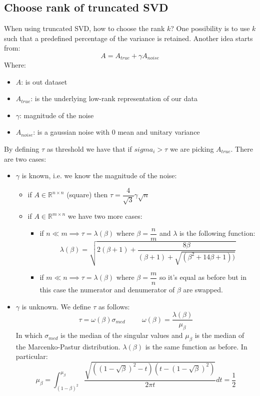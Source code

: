 \subsection*{Choose rank of truncated SVD}
When using truncated SVD, how to choose the rank $k$? One possibility is to use $k$ such that a predefined percentage of the variance is retained. Another idea starts from:
\[
    A = A_{true} + \gamma A_{noise}    
\]
Where: 
\begin{itemize}
    \item $A$: is out dataset
    \item $A_{true}$: is the underlying low-rank representation of our data
    \item $\gamma$: magnitude of the noise
    \item $A_{noise}$: is a gaussian noise with 0 mean and unitary variance
\end{itemize}
By defining $\tau$ as threshold we have that if $sigma_i > \tau$ we are picking $A_{true}$. 
There are two cases:
\begin{itemize}
    \item $\gamma$ is known, i.e. we know the magnitude of the noise:
    \begin{itemize}
        \item if $A \in \mathbb{R}^{n \times n}$ (square) then $\tau = \dfrac{4}{\sqrt{3}}\gamma \sqrt{n}$
        \item if $A \in \mathbb{R}^{m \times n}$ we have two more cases:
        \begin{itemize}
            \item if $n \ll m \implies \tau = \lambda(\beta)$ where $\beta = \dfrac{n}{m}$ and $\lambda$ is the following function:
            \[
                \lambda(\beta) = \sqrt{2(\beta + 1) + \dfrac{8\beta}{(\beta+1)+\sqrt{(\beta^2 + 14\beta + 1))}}}    
            \]
            \item if $m \ll n \implies \tau = \lambda(\beta)$ where $\beta = \dfrac{m}{n}$ so it's equal as before but in this case the numerator and denumerator of $\beta$ are swapped.
        \end{itemize}
    \end{itemize}
    \item $\gamma$ is unknown. We define $\tau$ as follows:
    \[
        \tau = \omega(\beta)\sigma_{med} \hspace{1cm} \omega(\beta) = \dfrac{\lambda(\beta)}{\mu_{\beta}}    
    \]
    In which $\sigma_{med}$ is the median of the singular values and $\mu_{\beta}$ is the median of the Marcenko-Pastur distribution. $\lambda(\beta)$ is the same function as before. In particular:
    \[
        \mu_{\beta} = \int_{(1-\beta)^2}^{\mu_{\beta}} \dfrac{\sqrt{((1- \sqrt{\beta})^2 - t)(t - (1- \sqrt{\beta})^2)}}{2\pi t} dt = \dfrac{1}{2}    
    \]
\end{itemize}

